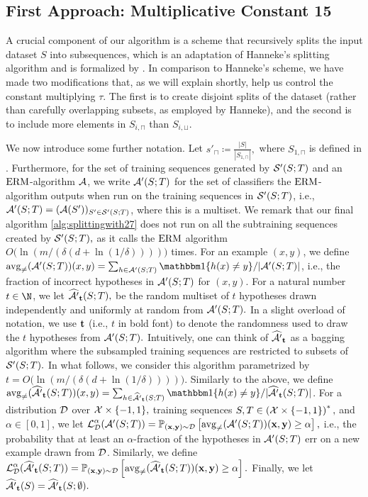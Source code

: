 \subsection{First Approach: Multiplicative Constant 15}\label{sec:large-constant-sketch}
A crucial component of our algorithm
is a scheme that recursively splits the
input dataset $S$ into subsequences, 
which is an adaptation of Hanneke's splitting algorithm \citep{hanneke2016optimal} and is formalized by
.
In comparison to Hanneke's scheme, we have made two modifications that, as we will explain shortly,
help us control the constant multiplying $\tau$.
The first is to create disjoint splits
of the dataset {(rather than carefully overlapping subsets, as employed by Hanneke)}, and the second is to include more elements in $S_{i,\sqcap}$
than $S_{i,\sqcup}.$ 

We now introduce some further notation.
Let $s'_{\sqcap}\coloneqq\frac{|S|}{|S_{1,\sqcap}|},$
where $S_{1,\sqcap}$ is defined in .
Furthermore,  for the set of training sequences generated by $ \mathcal{S}'(S;T) $ and an $ \mathrm{ERM} $-algorithm $ \mathcal{A} $, we  write $ \mathcal{A}'(S;T) $ for the set of classifiers the $ \mathrm{ERM} $-algorithm outputs when run on the training sequences in $ \mathcal{S}'(S;T) $, i.e., $ \mathcal{A}'(S;T)=( \mathcal{A}(S') )_{S'\in\mathcal{S}'(S;T)}  $, where this is   a multiset.
We remark that our final algorithm 
\cref{alg:splittingwith27} does not run on all the subtraining sequences created by $ \mathcal{S}'(S;T),$ as  
 it calls the $ \mathrm{ERM} $ algorithm $ O \big(\ln{\left(m/(\delta(d+\ln{\left(1/\delta \right)})) \right)} \big) $ times. 
For an example $ (x,y)$, we define $ \avg(\erm'(S;T))(x,y)=\sum_{h\in \erm'(S;T)}\ind\{ h(x)\not=y \}/|\erm'(S;T)| $, i.e., the fraction of incorrect hypotheses in $ \mathcal{A}'(S;T)$ for $(x, y)$.  
For a natural number $ t \in \N$, we let $ \widehat{\mathcal{A}'}_{\mathbf{t}}(S;T),$ be the {random} multiset of $ t $ hypotheses drawn independently and uniformly at random from $ \mathcal{A}'(S;T).$
In a slight overload of notation, we use 
$ \mathbf{t} $ (i.e., $ t $ in bold font) to denote the randomness used to draw the $ t $ hypotheses from $ \mathcal{A}'(S;T).$ 
Intuitively, one can think of $ \widehat{\mathcal{A}'}_{\mathbf{t}} $ as a bagging algorithm where the subsampled training sequences are restricted to subsets of $ \mathcal{S}'(S;T).$
In what follows, we consider this algorithm parametrized by $ t=O \big(\ln{\left(m/(\delta(d+\ln{\left(1/\delta \right)})) \right)}\big).$ 
Similarly to the above, we define $\avg(\widehat{\erm'}_{\rt}(S;T))(x,y)=\sum_{h\in \widehat{\erm'}_{\rt}(S;T)}\ind\{ h(x)\not=y \}/|\widehat{\erm'}_{\rt}(S;T)|$.
For a distribution $ \mathcal{D} $ over $ \mathcal{X}\times \{ -1,1\},$ training sequences $S, T\in \left(\mathcal{X}\times\{  -1,1\} \right)^{*},$ and $ \alpha\in[0,1]$,  we let $ \operatorname{\mathcal{L}}_{\mathcal{D}}^{\alpha}(\mathcal{A}'(S;T))=\operatorname*{\mathbb{P}}_{(\mathbf{x},\mathbf{y})\sim \mathcal{D}}\left[\operatorname{\mathrm{avg}_{\not=}}(\mathcal{A}'(S;T))(\mathbf{x},\mathbf{y}) \geq \alpha\right],$ i.e., the probability that at least an $ \alpha $-fraction of the hypotheses in $ \mathcal{A}'(S;T) $ err on a new example drawn from $ \mathcal{D} $.
Similarly, we define $ \operatorname{\mathcal{L}}_{\mathcal{D}}^{\alpha}(\widehat{\mathcal{A}'}_{\mathbf{t}}(S;T))=\operatorname*{\mathbb{P}}_{(\mathbf{x},\mathbf{y})\sim \mathcal{D}}\left[\operatorname{\mathrm{avg}_{\not=}}(\widehat{\mathcal{A}'}_{\mathbf{t}}(S;T))(\mathbf{x},\mathbf{y}) \geq \alpha\right].$ Finally, we let $ \widehat{\mathcal{A}'}_{\mathbf{t}}(S)=\widehat{\mathcal{A}'}_{\mathbf{t}}(S;\emptyset). $  

